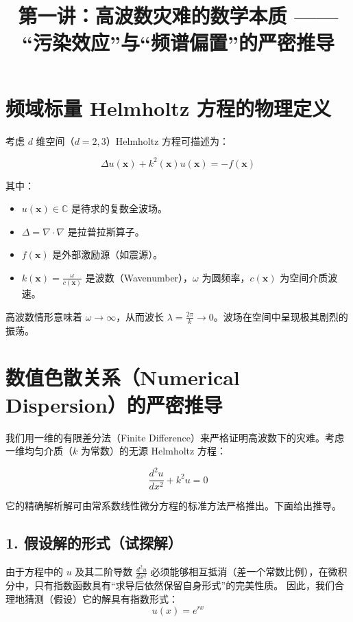 \documentclass[12pt]{article}
\title{第一讲：高波数灾难的数学本质 —— “污染效应”与“频谱偏置”的严密推导}
\author{}
\date{}
\begin{document}
\maketitle

\section{频域标量 Helmholtz 方程的物理定义}

考虑 $d$ 维空间（$d=2,3$）Helmholtz 方程可描述为：

\begin{equation}
\Delta u(\mathbf{x}) + k^2(\mathbf{x}) u(\mathbf{x}) = -f(\mathbf{x})
\label{eq:1-1}
\end{equation}

其中：
\begin{itemize}[leftmargin=2em]
    \item $u(\mathbf{x}) \in \mathbb{C}$ 是待求的复数全波场。
    \item $\Delta = \nabla \cdot \nabla$ 是拉普拉斯算子。
    \item $f(\mathbf{x})$ 是外部激励源（如震源）。
    \item $k(\mathbf{x}) = \frac{\omega}{c(\mathbf{x})}$ 是波数（Wavenumber），$\omega$ 为圆频率，$c(\mathbf{x})$ 为空间介质波速。
\end{itemize}

高波数情形意味着 $\omega \to \infty$，从而波长 $\lambda = \frac{2\pi}{k} \to 0$。波场在空间中呈现极其剧烈的振荡。

\section{数值色散关系（Numerical Dispersion）的严密推导}

我们用一维的有限差分法（Finite Difference）来严格证明高波数下的灾难。考虑一维均匀介质（$k$ 为常数）的无源 Helmholtz 方程：

\begin{equation}
\frac{d^2 u}{dx^2} + k^2 u = 0
\label{eq:1-2}
\end{equation}

它的精确解析解可由常系数线性微分方程的标准方法严格推出。下面给出推导。

\subsection*{1. 假设解的形式（试探解）}

由于方程中的 $u$ 及其二阶导数 $\frac{d^2 u}{dx^2}$ 必须能够相互抵消（差一个常数比例），在微积分中，只有指数函数具有“求导后依然保留自身形式”的完美性质。
因此，我们合理地猜测（假设）它的解具有指数形式：
\begin{equation}
u(x) = e^{rx}
\label{eq:trial-solution}
\end{equation}
\end{document}
